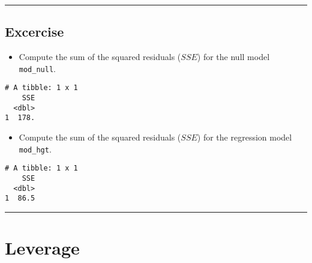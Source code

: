 \documentclass[
]{book}
\newenvironment{Shaded}{\begin{snugshade}}{\end{snugshade}}
\newcommand{\CommentTok}[1]{\textcolor[rgb]{0.56,0.35,0.01}{\textit{#1}}}
\newcommand{\DataTypeTok}[1]{\textcolor[rgb]{0.13,0.29,0.53}{#1}}
\newcommand{\KeywordTok}[1]{\textcolor[rgb]{0.13,0.29,0.53}{\textbf{#1}}}
\newcommand{\NormalTok}[1]{#1}
\newcommand{\OperatorTok}[1]{\textcolor[rgb]{0.81,0.36,0.00}{\textbf{#1}}}
\newcommand{\StringTok}[1]{\textcolor[rgb]{0.31,0.60,0.02}{#1}}
\providecommand{\tightlist}{%
  \setlength{\itemsep}{0pt}\setlength{\parskip}{0pt}}
\begin{document}
\begin{center}\rule{0.5\linewidth}{0.5pt}\end{center}

\hypertarget{excercise-5}{%
\subsection*{Excercise}\label{excercise-5}}

\begin{itemize}
\tightlist
\item
  Compute the sum of the squared residuals (\(SSE\)) for the null model \texttt{mod\_null}.
\end{itemize}

\begin{Shaded}
\end{Shaded}

\begin{verbatim}
# A tibble: 1 x 1
    SSE
  <dbl>
1  178.
\end{verbatim}

\begin{itemize}
\tightlist
\item
  Compute the sum of the squared residuals (\(SSE\)) for the regression model \texttt{mod\_hgt}.
\end{itemize}

\begin{Shaded}
\end{Shaded}

\begin{verbatim}
# A tibble: 1 x 1
    SSE
  <dbl>
1  86.5
\end{verbatim}

\begin{center}\rule{0.5\linewidth}{0.5pt}\end{center}

\hypertarget{leverage}{%
\section{Leverage}\label{leverage}}
\end{document}
